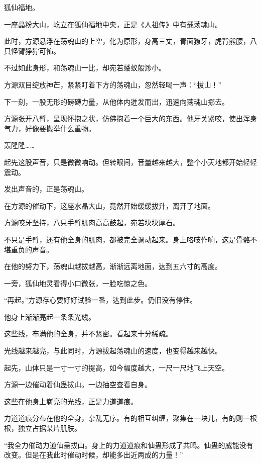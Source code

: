 
\begin{this_body}



狐仙福地。

一座晶粉大山，屹立在狐仙福地中央，正是《人祖传》中有载荡魂山。

此时，方源悬浮在荡魂山的上空，化为原形，身高三丈，青面獠牙，虎背熊腰，八只怪臂狰狞可怖。

不过如此身形，和荡魂山一比，却宛若蝼蚁般渺小。

方源双目绽放神芒，紧紧盯着下方的荡魂山，忽然轻喝一声：“拔山！”

下一刻，一股无形的磅礴力量，从他体内迸发而出，迅速向荡魂山挪去。

方源张开八臂，呈现怀抱之状，仿佛抱着一个巨大的东西。他牙关紧咬，使出浑身气力，好像要搬举什么重物。

轰隆隆……

起先这股声音，只是微微响动。但转眼间，音量越来越大，整个小天地都开始轻轻震动。

发出声音的，正是荡魂山。

在方源的催动下，这座水晶大山，竟然开始缓缓拔升，离开了地面。

方源咬牙坚持，八只手臂肌肉高高鼓起，宛若块块厚石。

不只是手臂，还有他全身的肌肉，都被完全调动起来。身上咯吱作响，这是骨骼不堪重负的声音。

在他的努力下，荡魂山越拔越高，渐渐远离地面，达到五六寸的高度。

一旁，狐仙地灵看得小口微张，一脸吃惊之色。

“再起。”方源存心要好好试验一番，达到此步。仍旧没有停住。

他身上渐渐亮起一条条光线。

这些线，布满他的全身，并不紧密。看起来十分稀疏。

光线越来越亮，与此同时，方源拔起荡魂山的速度，也变得越来越快。

起先，山体只是一寸一寸的提高，如今幅度越大，一尺一尺地飞上天空。

方源一边催动着仙蛊拔山。一边抽空查看自身。

这些在他身上崭亮的光线，正是力道道痕。

力道道痕分布在他的全身，杂乱无序。有的相互纠缠，聚集在一块儿，有的则一根根，独立占据某片肌肤。

“我全力催动力道仙蛊拔山。身上的力道道痕和仙蛊形成了共鸣。仙蛊的威能没有改变。但是在我此时催动时候，却能多出近两成的力量！”


\end{this_body}
